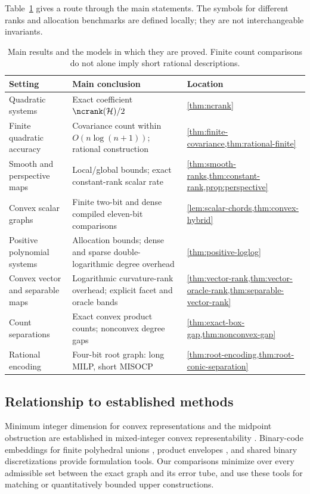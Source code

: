 Table~\ref{tab:result-map} gives a route through the main statements.
The symbols for different ranks and allocation benchmarks are defined
locally; they are not interchangeable invariants.
\begin{table}[htbp]
\centering\small
\begin{tabular}{@{}>{\raggedright\arraybackslash}p{}>{\raggedright\arraybackslash}p{}>{\raggedright\arraybackslash}p{}@{}}
\toprule
Setting & Main conclusion & Location\\
\midrule
Quadratic systems & Exact coefficient $\ncrank(\mathcal H)/2$ & \cref{thm:ncrank}\\
Finite quadratic accuracy & Covariance count within $O(n\log(n+1))$; rational construction & \cref{thm:finite-covariance,thm:rational-finite}\\
Smooth and perspective maps & Local/global bounds; exact constant-rank scalar rate & \cref{thm:smooth-ranks,thm:constant-rank,prop:perspective}\\
Convex scalar graphs & Finite two-bit and dense compiled eleven-bit comparisons & \cref{lem:scalar-chords,thm:convex-hybrid}\\
Positive polynomial systems & Allocation bounds; dense and sparse double-logarithmic degree overhead & \cref{thm:positive-loglog}\\
Convex vector and separable maps & Logarithmic curvature-rank overhead; explicit facet and oracle bands & \cref{thm:vector-rank,thm:vector-oracle-rank,thm:separable-vector-rank}\\
Count separations & Exact convex product counts; nonconvex degree gaps & \cref{thm:exact-box-gap,thm:nonconvex-gap}\\
Rational encoding & Four-bit root graph: long MILP, short MISOCP & \cref{thm:root-encoding,thm:root-conic-separation}\\
\bottomrule
\end{tabular}
\caption{Main results and the models in which they are proved. Finite count
comparisons do not alone imply short rational descriptions.}
\label{tab:result-map}
\end{table}

\subsection{Relationship to established methods}

Minimum integer dimension for convex representations and the midpoint
obstruction are established in mixed-integer convex representability
\citep{lubin2022}. Binary-code embeddings for finite polyhedral unions
\citep{vielma2018}, product envelopes \citep{mccormick1976}, and shared
binary discretizations \citep{beach2024,beach2024b,teles2013} provide
formulation tools. Our comparisons minimize over every admissible set
between the exact graph and its error tube, and use these tools for
matching or quantitatively bounded upper constructions.

